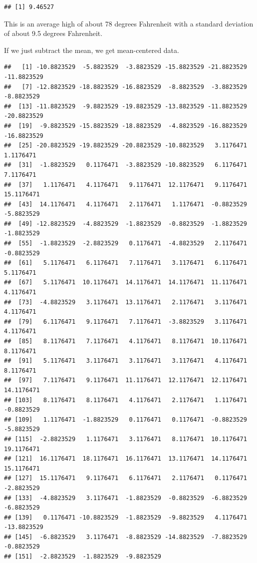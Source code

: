 \documentclass[
]{book}
\newenvironment{Shaded}{\begin{snugshade}}{\end{snugshade}}
\newcommand{\FunctionTok}[1]{\textcolor[rgb]{0.00,0.00,0.00}{#1}}
\newcommand{\NormalTok}[1]{#1}
\newcommand{\SpecialCharTok}[1]{\textcolor[rgb]{0.00,0.00,0.00}{#1}}
\begin{document}
\begin{verbatim}
## [1] 9.46527
\end{verbatim}

This is an average high of about 78 degrees Fahrenheit with a standard deviation of about 9.5 degrees Fahrenheit.

If we just subtract the mean, we get mean-centered data.

\begin{Shaded}
\end{Shaded}

\begin{verbatim}
##   [1] -10.8823529  -5.8823529  -3.8823529 -15.8823529 -21.8823529 -11.8823529
##   [7] -12.8823529 -18.8823529 -16.8823529  -8.8823529  -3.8823529  -8.8823529
##  [13] -11.8823529  -9.8823529 -19.8823529 -13.8823529 -11.8823529 -20.8823529
##  [19]  -9.8823529 -15.8823529 -18.8823529  -4.8823529 -16.8823529 -16.8823529
##  [25] -20.8823529 -19.8823529 -20.8823529 -10.8823529   3.1176471   1.1176471
##  [31]  -1.8823529   0.1176471  -3.8823529 -10.8823529   6.1176471   7.1176471
##  [37]   1.1176471   4.1176471   9.1176471  12.1176471   9.1176471  15.1176471
##  [43]  14.1176471   4.1176471   2.1176471   1.1176471  -0.8823529  -5.8823529
##  [49] -12.8823529  -4.8823529  -1.8823529  -0.8823529  -1.8823529  -1.8823529
##  [55]  -1.8823529  -2.8823529   0.1176471  -4.8823529   2.1176471  -0.8823529
##  [61]   5.1176471   6.1176471   7.1176471   3.1176471   6.1176471   5.1176471
##  [67]   5.1176471  10.1176471  14.1176471  14.1176471  11.1176471   4.1176471
##  [73]  -4.8823529   3.1176471  13.1176471   2.1176471   3.1176471   4.1176471
##  [79]   6.1176471   9.1176471   7.1176471  -3.8823529   3.1176471   4.1176471
##  [85]   8.1176471   7.1176471   4.1176471   8.1176471  10.1176471   8.1176471
##  [91]   5.1176471   3.1176471   3.1176471   3.1176471   4.1176471   8.1176471
##  [97]   7.1176471   9.1176471  11.1176471  12.1176471  12.1176471  14.1176471
## [103]   8.1176471   8.1176471   4.1176471   2.1176471   1.1176471  -0.8823529
## [109]   1.1176471  -1.8823529   0.1176471   0.1176471  -0.8823529  -5.8823529
## [115]  -2.8823529   1.1176471   3.1176471   8.1176471  10.1176471  19.1176471
## [121]  16.1176471  18.1176471  16.1176471  13.1176471  14.1176471  15.1176471
## [127]  15.1176471   9.1176471   6.1176471   2.1176471   0.1176471  -2.8823529
## [133]  -4.8823529   3.1176471  -1.8823529  -0.8823529  -6.8823529  -6.8823529
## [139]   0.1176471 -10.8823529  -1.8823529  -9.8823529   4.1176471 -13.8823529
## [145]  -6.8823529   3.1176471  -8.8823529 -14.8823529  -7.8823529  -0.8823529
## [151]  -2.8823529  -1.8823529  -9.8823529
\end{verbatim}
\end{document}
